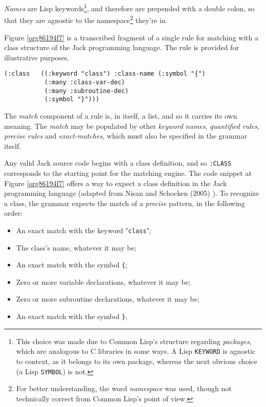 \documentclass[a4paper,11pt,oneside]{article}
\begin{document}
\emph{Names} are Lisp keywords\footnote{This choice was made due to Common Lisp's structure regarding
\emph{packages}, which are analogous to C libraries in some ways. A Lisp
\texttt{KEYWORD} is agnostic to context, as it belongs to its own package,
whereas the next obvious choice (a Lisp \texttt{SYMBOL}) is not.}, and therefore are prepended with a
double colon, so that they are agnostic to the namespace\footnote{For better understanding, the word \emph{namespace} was used, though
not technically correct from Common Lisp's point of view.} they're
in.

Figure \ref{org86194f7} is a transcribed fragment of a single rule
for matching with a class structure of the Jack programming
language. The rule is provided for illustrative purposes.

\begin{verbatim}
(:class   ((:keyword "class") :class-name (:symbol "{")
           (:many :class-var-dec)
           (:many :subroutine-dec)
           (:symbol "}")))
\end{verbatim}
\hfill \break

The \emph{match} component of a rule is, in itself, a list, and so it carries
its own meaning. The \emph{match} may be populated by other \emph{keyword names},
\emph{quantified rules}, \emph{precise rules} and \emph{exact-matches}, which must also be
specified in the grammar itself.

Any valid Jack source code begins with a class definition, and so
\texttt{:CLASS} corresponds to the starting point for the matching engine. The
code snippet at Figure \ref{org86194f7} offers a way to expect a class
definition in the Jack programming language (adapted from Nisan and
Schocken (2005) \cite{nand2tetris}). To recognize a class, the grammar
expects the match of a \emph{precise} pattern, in the following order:

\begin{itemize}
\item An exact match with the keyword "\texttt{class}";
\item The class's name, whatever it may be;
\item An exact match with the symbol \texttt{\{};
\item Zero or more variable declarations, whatever it may be;
\item Zero or more subroutine declarations, whatever it may be;
\item An exact match with the symbol \texttt{\}}.
\end{itemize}
\end{document}

